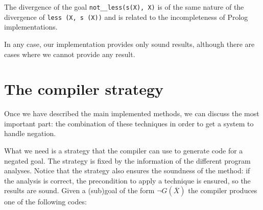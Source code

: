 \documentclass[]{llncs}
\begin{document}
\smallskip
The divergence of the goal {\tt not\_\_less(s(X), X)} is of the
same nature of the divergence of {\tt less (X, s (X))} and is
related to the incompleteness of Prolog implementations.

In any case, our implementation provides only sound results, although
there are cases where we cannot provide any result.




\vspace{-7pt}
\section{The compiler strategy}
\vspace{-7pt}
Once we have described the main implemented methods,
we can discuss the most important part: the combination of
these techniques in order to get a system to handle negation.

What we need is a strategy that the compiler can use to generate code
for a negated goal. The strategy is fixed by the information of the
different program analyses.  Notice that the strategy also ensures the
soundness of the method: if the analysis is correct, the precondition
to apply a technique is ensured, so the results are sound.  Given a
(sub)goal of the form $\neg G (\overline{X})$ the compiler produces
one of the following codes:
\end{document}
